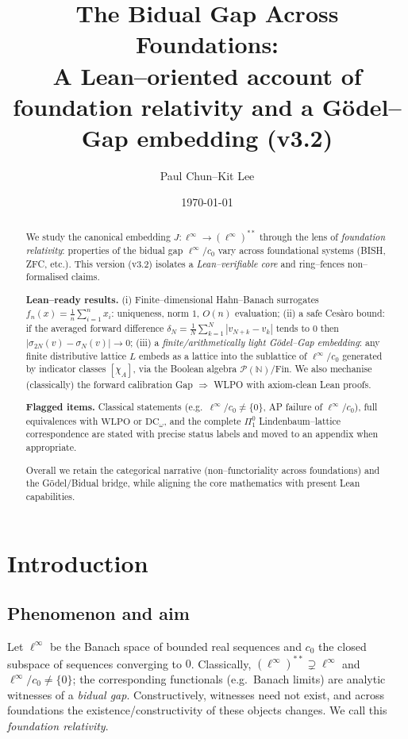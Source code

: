 \documentclass[11pt]{article}
\title{The Bidual Gap Across Foundations:\\
A Lean--oriented account of foundation relativity and a Gödel--Gap embedding (v3.2)}
\author{Paul Chun--Kit Lee}
\date{\today}
\theoremstyle{definition}
\newcommand{\N}{\mathbb{N}}
\newcommand{\linf}{\ell^\infty}
\newcommand{\cnull}{c_0}
\newcommand{\WLPO}{\mathrm{WLPO}}
\newcommand{\DCw}{\mathrm{DC}_\omega}
\begin{document}
\maketitle

\begin{abstract}
We study the canonical embedding $J:\linf\to(\linf)^{**}$ through the lens of
\emph{foundation relativity}: properties of the bidual gap $\linf/\cnull$ vary across
foundational systems (BISH, ZFC, etc.). This version (v3.2) isolates a
\emph{Lean--verifiable core} and ring--fences non--formalised claims.

\smallskip
\noindent
\textbf{Lean--ready results.}
(i) Finite--dimensional Hahn--Banach surrogates $f_n(x)=\frac1n\sum_{i=1}^n x_i$:
uniqueness, norm $1$, $O(n)$ evaluation; (ii) a safe Cesàro bound:
if the averaged forward difference $\delta_N=\frac1N\sum_{k=1}^N|v_{N+k}-v_k|$ tends to $0$
then $|\sigma_{2N}(v)-\sigma_N(v)|\to0$; (iii) a \emph{finite/arithmetically light
Gödel--Gap embedding}: any finite distributive lattice $L$ embeds as a lattice into the
sublattice of $\linf/\cnull$ generated by indicator classes $[\chi_A]$, via the Boolean
algebra $\mathcal P(\N)/\mathrm{Fin}$. We also mechanise (classically) the forward
calibration Gap $\Rightarrow$ WLPO with axiom-clean Lean proofs.

\smallskip
\noindent
\textbf{Flagged items.}
Classical statements (e.g.\ $\linf/\cnull\ne\{0\}$, AP failure of $\linf/\cnull$),
full equivalences with $\WLPO$ or $\DCw$, and the complete $\Pi^0_1$ Lindenbaum--lattice correspondence
are stated with precise status labels and moved to an appendix when appropriate.

\smallskip
Overall we retain the categorical narrative (non--functoriality across foundations) and the
Gödel/Bidual bridge, while aligning the core mathematics with present Lean capabilities.
\end{abstract}

\tableofcontents

\section{Introduction}

\subsection{Phenomenon and aim}
Let $\linf$ be the Banach space of bounded real sequences and $\cnull$ the closed subspace of
sequences converging to $0$. Classically, $(\linf)^{**}\!\supsetneq\linf$ and
$\linf/\cnull\ne\{0\}$; the corresponding functionals (e.g.\ Banach limits) are analytic
witnesses of a \emph{bidual gap}. Constructively, witnesses need not exist, and across
foundations the existence/constructivity of these objects changes. We call this
\emph{foundation relativity}.
\end{document}
